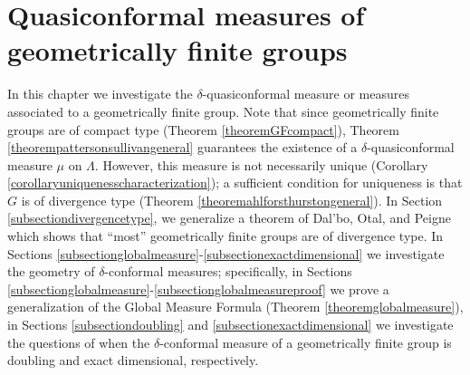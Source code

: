 %


\chapter{Quasiconformal measures of geometrically finite groups}
\label{sectionGFmeasures}

In this chapter we investigate the $\delta$-quasiconformal measure or measures associated to a geometrically finite group. Note that since geometrically finite groups are of compact type (Theorem \ref{theoremGFcompact}), Theorem \ref{theorempattersonsullivangeneral} guarantees the existence of a $\delta$-quasiconformal measure $\mu$ on $\Lambda$. However, this measure is not necessarily unique (Corollary \ref{corollaryuniquenesscharacterization}); a sufficient condition for uniqueness is that $G$ is of divergence type (Theorem \ref{theoremahlforsthurstongeneral}). In Section \ref{subsectiondivergencetype}, we generalize a theorem of Dal'bo, Otal, and Peigne \cite[Th\'eor\`eme A]{DOP} which shows that ``most'' geometrically finite groups are of divergence type. In Sections \ref{subsectionglobalmeasure}-\ref{subsectionexactdimensional} we investigate the geometry of $\delta$-conformal measures; specifically, in Sections \ref{subsectionglobalmeasure}-\ref{subsectionglobalmeasureproof} we prove a generalization of the Global Measure Formula (Theorem \ref{theoremglobalmeasure}), in Sections \ref{subsectiondoubling} and \ref{subsectionexactdimensional} we investigate the questions of when the $\delta$-conformal measure of a geometrically finite group is doubling and exact dimensional, respectively.

